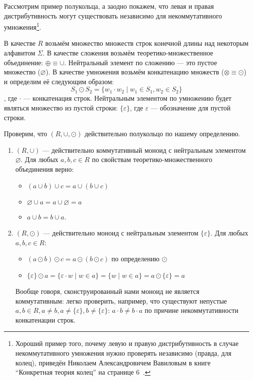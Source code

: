 \begin{example}\label{exmpl:semiring}
Рассмотрим пример полукольца, а заодно покажем, что левая и правая дистрибутивность могут существовать независимо для некоммутативного умножения\footnote{Хороший пример того, почему левую и правую дистрибутивность в случае некоммутативного умножения нужно проверять независимо (правда, для колец), приведён Николаем Александровичем Вавиловым в книге ``Конкретная теория колец'' на странице 6~\cite{VavilovRings}.}.

В качестве $R$ возьмём множество множеств строк конечной длины над некоторым алфавитом $\Sigma$. В качестве сложения возьмём теоретико-множественное объединение: $\oplus  \equiv \cup$. Нейтральный элемент по сложению --- это пустое множество ($\varnothing$).
В качестве умножения возьмём конкатенацию множеств ($\otimes  \equiv \odot$) и определим её следующим образом:
$$ S_1 \odot S_2 = \{ w_1 \cdot w_2 \mid w_1 \in S_1, w_2 \in S_2\}$$, где $\cdot$ --- конкатенация строк. Нейтральным элементом по умножению будет являться множество из пустой строки: $\{\varepsilon\}$, где $\varepsilon$ --- обозначение для пустой строки.

Проверим, что $(R, \cup, \odot)$ действительно полукольцо по нашему определению.

\begin{enumerate}

\item $(R, \cup)$ --- действительно коммутативный моноид с нейтральным элементом $\varnothing$. Для любых $a,b,c \in R$ по свойствам теоретико-множественного объединения верно:
\begin{itemize}
	\item $(a \cup b) \cup c = a \cup (b \cup c)$
	\item $\varnothing \cup a = a \cup \varnothing = a$
	\item $a \cup b = b \cup a$.
\end{itemize}

\item $(R, \odot)$ --- действительно моноид с нейтральным элементом $\{\varepsilon\}$. Для любых $a,b,c \in R$:
\begin{itemize}
	\item $(a \odot b) \odot c = a \odot (b \odot c)$ по определению $\odot$
    \item $\{\varepsilon\} \odot a = \{\varepsilon \cdot w \mid w \in a \} = \{w \mid w \in a \} = a \odot \{\varepsilon\} = a$
\end{itemize}
Вообще говоря, сконструированный нами моноид не является коммутативным: легко проверить, например, что существуют непустые $a,b \in R, a \neq b, a \neq \{\varepsilon\}, b \neq \{\varepsilon\}$: $a \cdot b \neq b \cdot a$ по причине некоммутативности конкатенации строк.


\end{enumerate}
\end{example}
